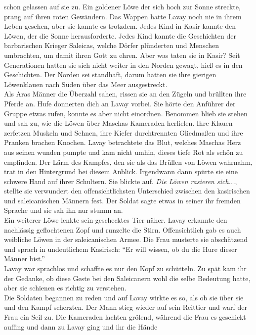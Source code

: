 schon gelassen auf sie zu. Ein goldener Löwe der sich hoch zur Sonne streckte, prang auf ihren 
roten Gewändern. Das Wappen hatte Lavay noch nie in ihrem Leben gesehen, aber sie kannte es 
trotzdem. Jedes Kind in Kasir kannte den Löwen, der die Sonne herausforderte. Jedes Kind kannte die 
Geschichten der barbarischen Krieger Saleicas, welche Dörfer plünderten und Menschen umbrachten, um 
damit ihren Gott zu ehren. Aber was taten sie in Kasir? Seit Generationen hatten sie sich nicht 
weiter in den Norden gewagt, hieß es in den Geschichten. Der Norden sei standhaft, darum hatten sie 
ihre gierigen Löwenklauen nach Süden über das Meer ausgestreckt.\\
Als Aras Männer die Überzahl sahen, rissen sie an den Zügeln und brüllten ihre Pferde an. Hufe 
donnerten dich an Lavay vorbei. Sie hörte den Anführer der Gruppe etwas rufen, konnte es aber nicht 
einordnen. Benommen blieb sie stehen und sah zu, wie die Löwen über Maschas Kameraden herfielen. 
Ihre Klauen zerfetzen Muskeln und Sehnen, ihre Kiefer durchtrennten Gliedmaßen und ihre Pranken 
brachen Knochen. Lavay betrachtete das Blut, welches Maschas Herz aus seinen wunden pumpte und kam 
nicht umhin, dieses tiefe Rot als schön zu empfinden. Der Lärm des Kampfes, den sie als das 
Brüllen von Löwen wahrnahm, trat in den Hintergrund bei diesem Anblick. Irgendwann dann spürte sie 
eine schwere Hand auf ihrer Schultern. Sie blickte auf. \textit{Die Löwen rasieren sich...}, 
stellte sie verwundert den offensichtlichsten Unterschied zwischen den kasirischen und 
saleicanischen Männern fest. Der Soldat sagte etwas in seiner ihr fremden Sprache und sie sah ihn 
nur stumm an.\\
Ein weiterer Löwe lenkte sein geschecktes Tier näher. Lavay erkannte den nachlässig geflochtenen 
Zopf und runzelte die Stirn. Offensichtlich gab es auch weibliche Löwen in der saleicanischen 
Armee. Die Frau musterte sie abschätzend und sprach in undeutlichem Kasirisch: ``Er will wissen, ob 
du die Hure dieser Männer bist.''\\
Lavay war sprachlos und schaffte es nur den Kopf zu schütteln. Zu spät kam ihr der Gedanke, ob 
diese Geste bei den Saleicanern wohl die selbe Bedeutung hatte, aber sie schienen es richtig zu 
verstehen.\\
Die Soldaten begannen zu reden und auf Lavay wirkte es so, als ob sie über sie und den Kampf 
scherzten. Der Mann stieg wieder auf sein Reittier und warf der Frau ein Seil zu. Die Kameraden 
lachten grölend, während die Frau es geschickt auffing und dann zu Lavay ging und ihr die Hände 
